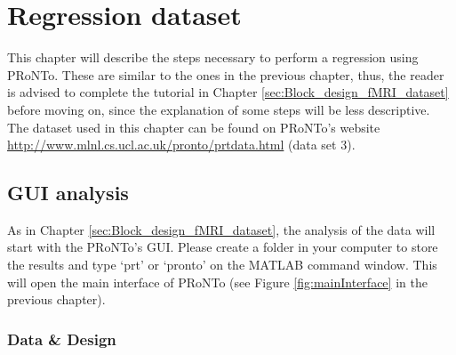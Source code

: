 
\chapter{Regression dataset}
\minitoc

This chapter will describe the steps necessary to perform a regression using PRoNTo. These are similar to the ones in the previous chapter, thus, the reader is advised to complete the tutorial in Chapter \ref{sec:Block_design_fMRI_dataset} before moving on, since the explanation of some steps will be less descriptive. The dataset used in this chapter can be found on PRoNTo's website \url{http://www.mlnl.cs.ucl.ac.uk/pronto/prtdata.html} (data set 3).


\section{GUI analysis}
As in Chapter \ref{sec:Block_design_fMRI_dataset}, the analysis of the data will start with the PRoNTo's GUI. Please create a folder in your computer to store the results and type `prt' or `pronto' on the MATLAB command window. This will open the main interface of PRoNTo (see Figure \ref{fig:mainInterface} in the previous chapter).



\subsection{Data \& Design}

